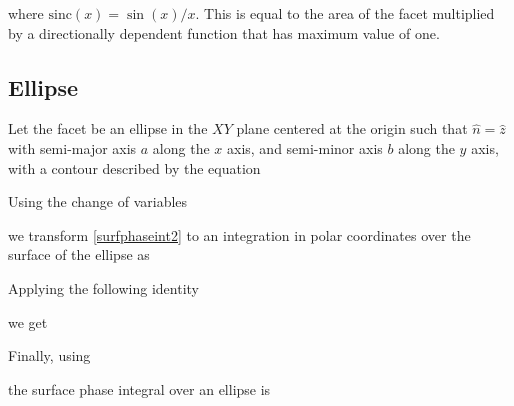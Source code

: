 
\noindent where $\textrm{sinc}(x) = \sin(x)/x$. This is equal to the area of the facet multiplied by a directionally dependent function that has maximum value of one.




\subsection{Ellipse}


Let the facet be an ellipse in the $XY$ plane centered at the origin such that $\hat{n} = \hat{z}$ with semi-major axis $a$ along the $x$ axis, and semi-minor axis $b$ along the $y$ axis, with a contour described by the equation

Using the change of variables

we transform \eqref{surfphaseint2} to an integration in polar coordinates over the surface of the ellipse as 

Applying the following identity

we get

Finally, using

the surface phase integral over an ellipse is


